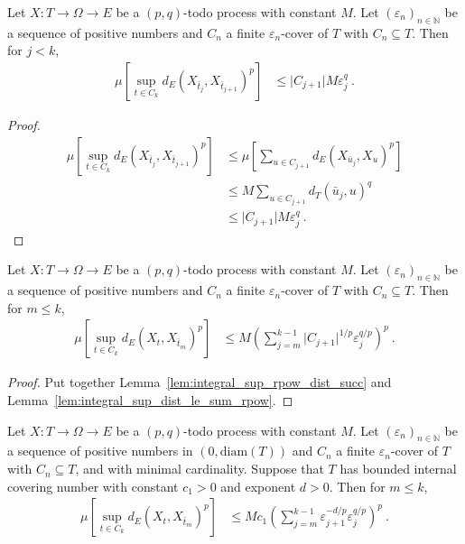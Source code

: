 \begin{lemma}\label{lem:integral_sup_rpow_dist_succ}
Let $X : T \to \Omega \to E$ be a $(p, q)$-todo process with constant $M$.
Let $(\varepsilon_n)_{n \in \mathbb{N}}$ be a sequence of positive numbers and $C_n$ a finite $\varepsilon_n$-cover of $T$ with $C_n \subseteq T$.
Then for $j < k$,
\begin{align*}
  \mu\left[\sup_{t \in C_k} d_E(X_{\bar{t}_j}, X_{\bar{t}_{j+1}})^p \right]
  &\le \vert C_{j+1} \vert M \varepsilon_j^q
  \: .
\end{align*}
\end{lemma}

\begin{proof}
\begin{align*}
  \mu\left[\sup_{t \in C_k} d_E(X_{\bar{t}_j}, X_{\bar{t}_{j+1}})^p \right]
  &\le \mu\left[\sum_{u \in C_{j+1}} d_E(X_{\bar{u}_j}, X_{u})^p \right]
  \\
  &\le M \sum_{u \in C_{j+1}} d_T(\bar{u}_j, u)^q
  \\
  &\le \vert C_{j+1} \vert M \varepsilon_j^q
  \: .
\end{align*}
\end{proof}


\begin{lemma}\label{lem:integral_sup_rpow_dist_le_sum}
Let $X : T \to \Omega \to E$ be a $(p, q)$-todo process with constant $M$.
Let $(\varepsilon_n)_{n \in \mathbb{N}}$ be a sequence of positive numbers and $C_n$ a finite $\varepsilon_n$-cover of $T$ with $C_n \subseteq T$.
Then for $m \le k$,
\begin{align*}
  \mu \left[\sup_{t \in C_k} d_E(X_t, X_{\bar{t}_m})^p \right]
  &\le M \left( \sum_{j=m}^{k-1} \vert C_{j+1} \vert^{1/p} \varepsilon_j^{q/p} \right)^p
  \: .
\end{align*}
\end{lemma}

\begin{proof}
Put together Lemma~\ref{lem:integral_sup_rpow_dist_succ} and Lemma~\ref{lem:integral_sup_dist_le_sum_rpow}.
\end{proof}


\begin{lemma}\label{lem:integral_sup_rpow_dist_le_of_minimal_cover}
Let $X : T \to \Omega \to E$ be a $(p, q)$-todo process with constant $M$.
Let $(\varepsilon_n)_{n \in \mathbb{N}}$ be a sequence of positive numbers in $(0, \mathrm{diam}(T))$ and $C_n$ a finite $\varepsilon_n$-cover of $T$ with $C_n \subseteq T$, and with minimal cardinality.
Suppose that $T$ has bounded internal covering number with constant $c_1>0$ and exponent $d > 0$.
Then for $m \le k$,
\begin{align*}
  \mu \left[\sup_{t \in C_k} d_E(X_t, X_{\bar{t}_m})^p \right]
  &\le M c_1 \left( \sum_{j=m}^{k-1} \varepsilon_{j+1}^{-d/p} \varepsilon_j^{q/p} \right)^p
  \: .
\end{align*}
\end{lemma}

